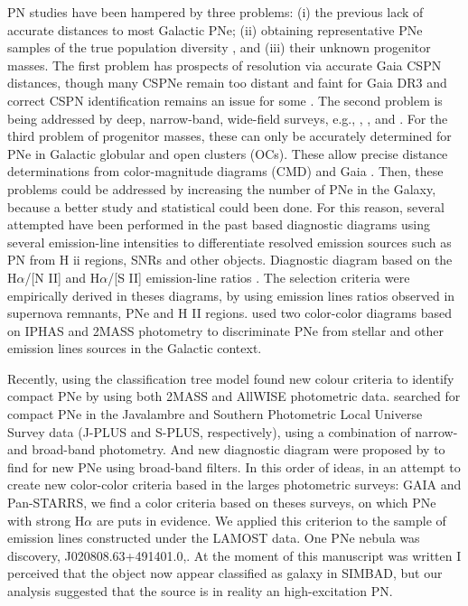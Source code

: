 \documentclass[fleqn,usenatbib]{mnras}
\begin{document}
PN studies have been hampered by three problems:
(i) the previous lack of accurate distances to most Galactic
PNe; (ii) obtaining representative PNe samples of the true
population diversity \citep{Parker:2022}, and (iii) their unknown
progenitor masses. The first problem has prospects of
resolution via accurate Gaia CSPN distances, though many
CSPNe remain too distant and faint for Gaia DR3 and correct
CSPN identification remains an issue for some \citep{Parker:2022}.
The second problem is being addressed by deep, narrow-band,
wide-field surveys, e.g., \citet{Parker:2005},
\citet{Drew:2005}, and \citet{Drew:2014}. For the third problem
of progenitor masses, these can only
be accurately determined for PNe in Galactic globular and
open clusters (OCs). These allow precise distance determinations
from color-magnitude diagrams (CMD) and Gaia \citep{Fragkou:2022}.
Then, these problems could be addressed by increasing the
number of PNe in the Galaxy, because a better study and statistical
could been done. For this reason, several attempted have been performed in the past
based diagnostic diagrams using several
emission-line intensities to differentiate resolved emission
sources such as PN from H {\sc ii} regions, SNRs and other objects.
Diagnostic diagram based on the H{$\alpha$}/[N II] and H{$\alpha$}/[S II]
emission-line ratios \citep{Sabbadin:1977, Fesen:1985, Riesgo:2006}.
The selection criteria were empirically derived in theses diagrams,
by using emission lines ratios observed in supernova remnants, PNe and H II regions.
\citet{Viironen:2009a, Viironen:2009b} used two color-color diagrams based on IPHAS
and 2MASS photometry to discriminate PNe from stellar and other emission lines sources
in the Galactic context. 

Recently, \citet{Akras:2019b} using the classification tree model
found new colour criteria to identify compact PNe  by
using both 2MASS and AllWISE photometric data. \citet{Gutierrez-Soto:2020}
searched for compact PNe in the Javalambre and Southern Photometric Local
Universe Survey data (J-PLUS and S-PLUS, respectively), using a combination
of narrow- and broad-band photometry. And new diagnostic diagram were proposed
by \citet{Vejar:2019} to find for new PNe using broad-band filters.
In this order of ideas, in an attempt to create new color-color criteria based
in the larges photometric surveys: GAIA and Pan-STARRS, we find a color criteria
based on theses surveys, on which PNe with strong H{$\alpha$} are puts in
evidence. We applied this criterion to the sample of emission lines constructed
under the LAMOST data. One PNe nebula was discovery, J020808.63+491401.0,.
At the moment of this manuscript was written I perceived that the
object now appear classified as galaxy in SIMBAD, but our analysis
suggested that the source is in reality an high-excitation PN. 
\end{document}
